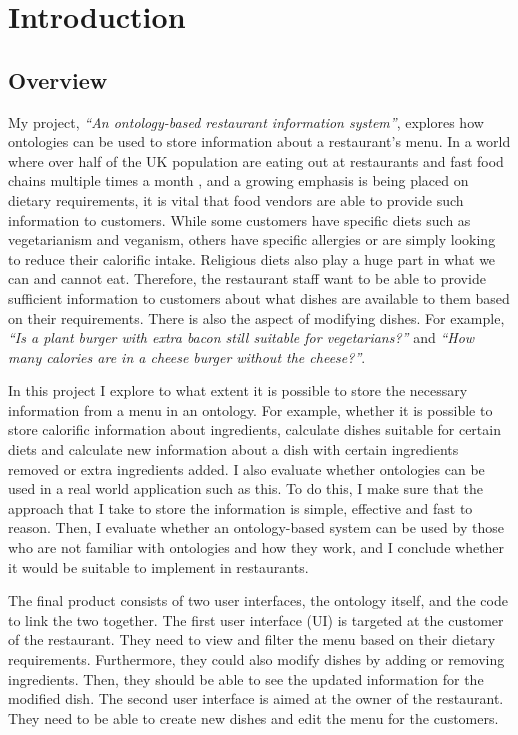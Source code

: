 \chapter{Introduction}

\section{Overview}

My project, \textit{``An ontology-based restaurant information system''}, explores how ontologies can be used to store information about a restaurant's menu. In a world where over half of the UK population are eating out at restaurants and fast food chains multiple times a month \cite{wunsch_2022}, and a growing emphasis is being placed on dietary requirements, it is vital that food vendors are able to provide such information to customers. While some customers have specific diets such as vegetarianism and veganism, others have specific allergies or are simply looking to reduce their calorific intake. Religious diets also play a huge part in what we can and cannot eat. Therefore, the restaurant staff want to be able to provide sufficient information to customers about what dishes are available to them based on their requirements. There is also the aspect of modifying dishes. For example, \textit{``Is a plant burger with extra bacon still suitable for vegetarians?''} and \textit{``How many calories are in a cheese burger without the cheese?''}.

In this project I explore to what extent it is possible to store the necessary information from a menu in an ontology. For example, whether it is possible to store calorific information about ingredients, calculate dishes suitable for certain diets and calculate new information about a dish with certain ingredients removed or extra ingredients added. I also evaluate whether ontologies can be used in a real world application such as this. To do this, I make sure that the approach that I take to store the information is simple, effective and fast to reason. Then, I evaluate whether an ontology-based system can be used by those who are not familiar with ontologies and how they work, and I conclude whether it would be suitable to implement in restaurants.

The final product consists of two user interfaces, the ontology itself, and the code to link the two together. The first user interface (UI) is targeted at the customer of the restaurant. They need to view and filter the menu based on their dietary requirements. Furthermore, they could also modify dishes by adding or removing ingredients. Then, they should be able to see the updated information for the modified dish. The second user interface is aimed at the owner of the restaurant. They need to be able to create new dishes and edit the menu for the customers.

